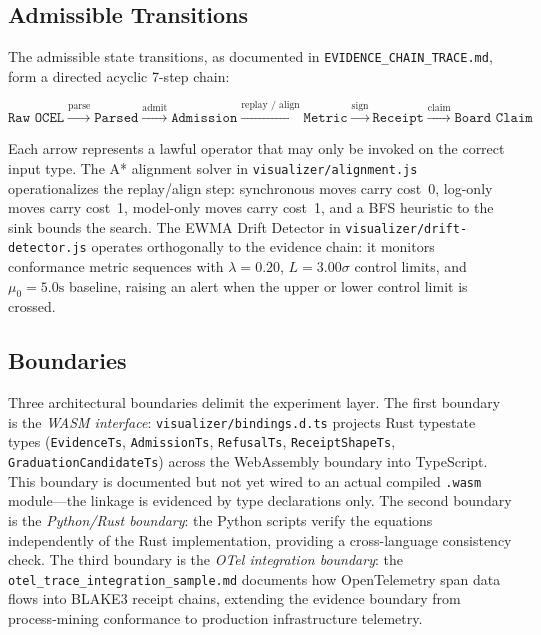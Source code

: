 \subsection{Admissible Transitions}
\label{sec:experiments-core-arch-transitions}

The admissible state transitions, as documented in \texttt{EVIDENCE\_CHAIN\_TRACE.md},
form a directed acyclic 7-step chain:

\[
  \texttt{Raw OCEL} \xrightarrow{\text{parse}} \texttt{Parsed} \xrightarrow{\text{admit}} \texttt{Admission}
  \xrightarrow{\text{replay / align}} \texttt{Metric} \xrightarrow{\text{sign}} \texttt{Receipt}
  \xrightarrow{\text{claim}} \texttt{Board Claim}
\]

Each arrow represents a lawful operator that may only be invoked on the correct
input type. The A* alignment solver in \texttt{visualizer/alignment.js} operationalizes
the replay/align step: synchronous moves carry cost~0, log-only moves carry cost~1,
model-only moves carry cost~1, and a BFS heuristic to the sink bounds the search.
The EWMA Drift Detector in \texttt{visualizer/drift-detector.js} operates
orthogonally to the evidence chain: it monitors conformance metric sequences with
$\lambda = 0.20$, $L = 3.00\sigma$ control limits, and $\mu_0 = 5.0\mathrm{s}$ baseline,
raising an alert when the upper or lower control limit is crossed.

\subsection{Boundaries}
\label{sec:experiments-core-arch-boundaries}

Three architectural boundaries delimit the experiment layer. The first boundary is
the \emph{WASM interface}: \texttt{visualizer/bindings.d.ts} projects Rust typestate
types (\texttt{EvidenceTs}, \texttt{AdmissionTs}, \texttt{RefusalTs},
\texttt{ReceiptShapeTs}, \texttt{GraduationCandidateTs}) across the WebAssembly
boundary into TypeScript. This boundary is documented but not yet wired to an actual
compiled \texttt{.wasm} module---the linkage is evidenced by type declarations only.
The second boundary is the \emph{Python/Rust boundary}: the Python scripts verify the
equations independently of the Rust implementation, providing a cross-language
consistency check. The third boundary is the \emph{OTel integration boundary}: the
\texttt{otel\_trace\_integration\_sample.md} documents how OpenTelemetry span data
flows into BLAKE3 receipt chains, extending the evidence boundary from process-mining
conformance to production infrastructure telemetry.

